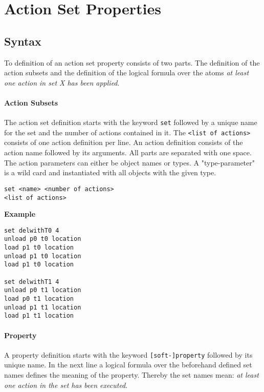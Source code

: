 \documentclass{article}
\begin{document}
\section{Action Set Properties}

\subsection{Syntax}

To definition of an action set property consists of two parts. The definition of 
the action subsets and the definition of the logical formula over the atoms 
\emph{at least one action in set X has been applied}.

\paragraph{Action Subsets}

The action set definition starts with the keyword \texttt{set} followed by a unique
name for the set and the number of actions contained in it.
The \texttt{<list of actions>} consists of one action definition per line.
An action definition consists of the action name followed by its arguments. 
All parts are separated with one space. 
The action parameters can either be object names or types. 
A "type-parameter" is a wild card and instantiated with all objects with the given type.

\begin{lstlisting}
set <name> <number of actions>
<list of actions>
\end{lstlisting}

\noindent
\textbf{Example}

\begin{lstlisting}
set delwithT0 4
unload p0 t0 location
load p1 t0 location
unload p1 t0 location
load p1 t0 location

set delwithT1 4
unload p0 t1 location
load p0 t1 location
unload p1 t1 location
load p1 t1 location
\end{lstlisting}

\paragraph{Property}

A property definition starts with the keyword \texttt{[soft-]property} followed 
by its unique name.
In the next line a logical formula over the beforehand defined set names defines 
the meaning of the property. Thereby the set names mean: \emph{at least one action in the set 
has been executed}.
\end{document}
